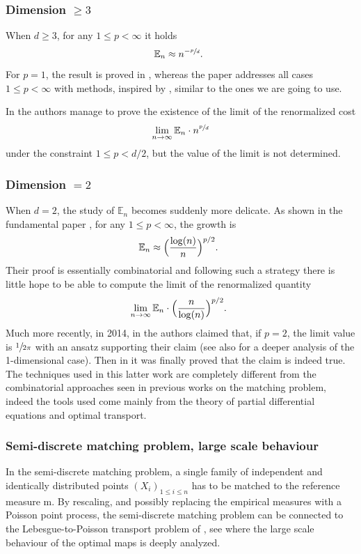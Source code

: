 \documentclass[10pt]{amsart}
\theoremstyle{plain}
\theoremstyle{definition}
\numberwithin{equation}{section}
\newcommand{\fullstop}{\ensuremath{\text{. }}}
\newcommand{\m}{\ensuremath{\mathrm m}}
\begin{document}
\subsubsection*{Dimension $\ge 3$}
When $d\ge 3$, for any $1\le p < \infty$ it holds
\begin{equation*}
\mathbb E_n \approx n^{-\sfrac pd} \fullstop
\end{equation*}
For $p=1$, the result is proved in \cite{Dobric1995,Talagrand1992}, whereas the
paper \cite{Ledoux2017} addresses all cases $1\le p < \infty$ with methods,
inspired by \cite{Ambrosio-Stra-Trevisan2018}, similar to the ones we are going to use.

In \cite[Th.\,2]{Barthe2013} the authors manage to prove the existence of the limit of the renormalized cost
\begin{equation*}
\lim_{n\to\infty}\mathbb E_n \cdot n^{\sfrac pd}
\end{equation*}
under the constraint $1\le p < d/2$, but the value of the limit is not determined.
\subsubsection*{Dimension $=2$}
When $d=2$, the study of $\mathbb E_n$ becomes suddenly more delicate.
As shown in the fundamental paper \cite{Ajtai1984}, for any $1\le p <\infty$, the growth is
\begin{equation*}
\mathbb E_n \approx \Bigl(\frac{\log(n)}{n}\Bigr)^{p/2} \fullstop
\end{equation*}
Their proof is essentially combinatorial and following such a strategy there is little hope to
be able to compute the limit of the renormalized quantity
\begin{equation*}
\lim_{n\to\infty} \mathbb E_n\cdot \Bigl(\frac{n}{\log(n)}\Bigr)^{p/2} \fullstop
\end{equation*}
Much more recently, in 2014, in \cite{CaraccioloEtAl2014} the authors claimed that, if $p=2$, the
limit value is $\sfrac1{2\pi}$ with an ansatz supporting their claim (see also \cite{Caracciolo2014one} for
a deeper analysis of the 1-dimensional case).
Then in \cite{Ambrosio-Stra-Trevisan2018} it was finally proved that the claim is indeed true.
The techniques used in this latter work are completely different from the combinatorial approaches
seen in previous works on the matching problem, indeed the tools used come mainly from the theory
of partial differential equations and optimal transport.

\subsubsection*{Semi-discrete matching problem, large scale behaviour}
In the semi-discrete matching problem, a single family of independent and identically distributed points
$(X_i)_{1\le i\le n}$ has to be matched to the reference measure $\m$.
By rescaling, and possibly replacing the empirical measures with
a Poisson point process, the semi-discrete matching problem can be connected to
the Lebesgue-to-Poisson transport problem of \cite{HuesmannSturm2013},
see \cite{Goldman2018} where the large scale behaviour of the optimal maps
is deeply analyzed.
\end{document}
